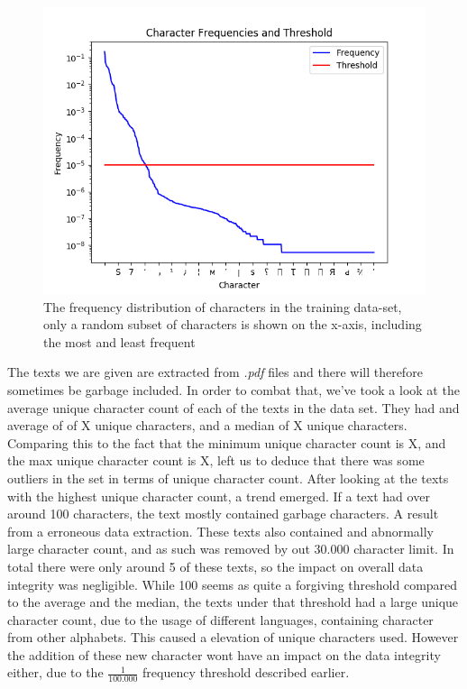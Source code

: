 \begin{figure}
    \centering
    \includegraphics[scale=.8]{./graphs/Frequencies.png}
    \caption{The frequency distribution of characters in the training data-set,
    only a random subset of characters is shown on the x-axis, including the
    most and least frequent}
    \label{fig:character_frequencies}
\end{figure}

The texts we are given are extracted from \textit{.pdf} files and there will
therefore sometimes be garbage included. In order to combat that, we've took
a look at the average unique character count of each of the texts in the data
set. They had and average of of X unique characters, and a median of X unique
characters. Comparing this to the fact that the minimum unique character count
is X, and the max unique character count is X, left us to deduce that there was
some outliers in the set in terms of unique character count. After looking at
the texts with the highest unique character count, a trend emerged. If a text
had over around 100 characters, the text mostly contained garbage characters.
A result from a erroneous data extraction. These texts also contained and
abnormally large character count, and as such was removed by out 30.000
character limit. In total there were only around 5 of these texts, so the impact
on overall data integrity was negligible. While 100 seems as quite a forgiving
threshold compared to the average and the median, the texts under that threshold
had a large unique character count, due to the usage of different languages,
containing character from other alphabets. This caused a elevation of unique
characters used. However the addition of these new character wont have an impact
on the data integrity either, due to the $\frac{1}{100.000}$ frequency threshold
described earlier.


